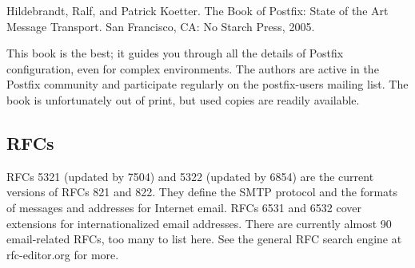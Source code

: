 {Hildebrandt, Ralf, and Patrick Koetter. }{The Book of Postfix: State of
the Art Message Transport.} San Francisco, CA: No Starch Press, 2005.

This book is the best; it guides you through all the details of Postfix
configuration, even for complex environments. The authors are active in
the Postfix community and participate regularly on the postfix-users
mailing list. The book is unfortunately out of print, but used copies
are readily available.


\subsection{RFCs}

RFCs 5321 (updated by 7504) and 5322 (updated by 6854) are the current
versions of RFCs 821 and 822. They define the SMTP protocol and the
formats of messages and addresses for Internet email. RFCs 6531 and 6532
cover extensions for internationalized email addresses. There are
currently almost 90 email-related RFCs, too many to list here. See the
general RFC search engine at rfc-editor.org for more.
